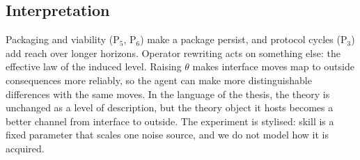 \subsection{Interpretation}
Packaging and viability (P$_5$, P$_6$) make a package persist, and protocol cycles (P$_3$) add reach over longer horizons. Operator rewriting acts on something else: the effective law of the induced level. Raising $\theta$ makes interface moves map to outside consequences more reliably, so the agent can make more distinguishable differences with the same moves. In the language of the thesis, the theory is unchanged as a level of description, but the theory object it hosts becomes a better channel from interface to outside. The experiment is stylised: skill is a fixed parameter that scales one noise source, and we do not model how it is acquired.
